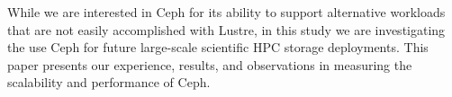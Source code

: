\begin{comment}
In comparison to other parallel file
systems, Ceph has a number of distinctive features:

\begin{itemize}
 
\item Ceph has an intelligent and powerful data placement mechanism, known as
  CRUSH. The CRUSH algorithm allows a client to pre-calculate object
  placement and layout while taking into consideration of failure domains and
  hierarchical storage tiers.
  
  \item From the start, Ceph's design anticipated managing meta data and the
  name space with a cluster of meta data servers. It utilized a dynamic subtree
  partitioning strategy to continuously adapt meta data distribution to current
  demands.

  \item Ceph's design assumes that the system is composed of unreliable
  components; fault-detection and fault-tolerance (e.g., replication) are the
  norm rather than the exception. This is in line with the expectations and
  future directions of Exascale computing.

  \item Ceph is built on top of a unified object management layer, RADOS. Both
  meta data and the file data can take advantage of this uniformity. On top of
  RADOS, Ceph build and project a host of other features such as RESTful
  interface, S3 and Swift-compliant API, cloud integration.

  \item Most of the Ceph processes reside in user-space. Generally speaking,
this makes the system easier to debug and maintain. The client-side support has
long been integrated into Linux mainline kernel, which eases the deployment and
out-of-box experience.

\end{itemize}
\end{comment}

While we are interested in Ceph for its ability to support alternative
workloads that are not easily accomplished with Lustre, in this study we are
investigating the use Ceph for future large-scale scientific HPC storage
deployments. This paper presents our experience, results, and observations in
measuring the scalability and performance of Ceph.  

